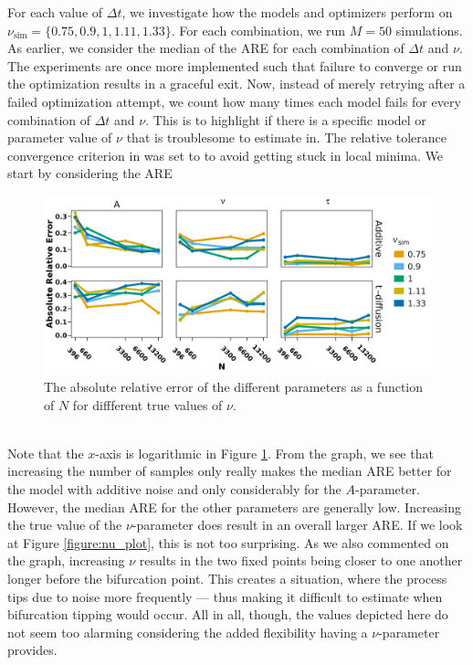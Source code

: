 For each value of $\Delta t$, we investigate how the models and optimizers perform on $\nu_{\mathrm{sim}} = \{0.75, 0.9, 1, 1.11, 1.33\}$. For each combination, we run $M = 50$ simulations. As earlier, we consider the median of the ARE for each combination of $\Delta t$ and $\nu$. The experiments are once more implemented such that failure to converge or run the optimization results in a graceful exit. Now, instead of merely retrying after a failed optimization attempt, we count how many times each model fails for every combination of $\Delta t$ and $\nu$. This is to highlight if there is a specific model or parameter value of $\nu$ that is troublesome to estimate in. The relative tolerance convergence criterion in  was set to  to avoid getting stuck in local minima. 
\newpage
\noindent We start by considering the ARE 
\begin{figure}[h!]
    \begin{center}
        \includegraphics[scale = .1]{figures/combined_nus_plot.jpeg}
        \caption{The absolute relative error of the different parameters as a function of $N$ for diffferent true values of $\nu$.}
        \label{figure:ARE_nu_plots}
    \end{center}
\end{figure}\\
Note that the $x$-axis is logarithmic in Figure \ref{figure:ARE_nu_plots}. From the graph, we see that increasing the number of samples only really makes the median ARE better for the model with additive noise and only considerably for the $A$-parameter. However, the median ARE for the other parameters are generally low. Increasing the true value of the $\nu$-parameter does result in an overall larger ARE. If we look at Figure \ref{figure:nu_plot}, this is not too surprising. As we also commented on the graph, increasing $\nu$ results in the two fixed points being closer to one another longer before the bifurcation point. This creates a situation, where the process tips due to noise more frequently — thus making it difficult to estimate when bifurcation tipping would occur. All in all, though, the values depicted here do not seem too alarming considering the added flexibility having a $\nu$-parameter provides. 
